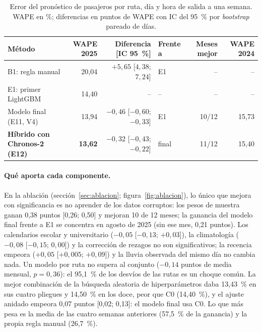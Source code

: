 \begin{table}[t]
  \centering\footnotesize
  \setlength{\tabcolsep}{3.5pt}
  \caption{Error del pronóstico de pasajeros por ruta, día y hora de salida a una semana. WAPE en \%; diferencias
  en puntos de WAPE con IC del 95~\% por \emph{bootstrap} pareado de días.}
  \label{tab:wape}
  \begin{tabular}{@{}l r r l r r@{}}
    \toprule
    Método & WAPE 2025 & Diferencia [IC 95~\%] & Frente a & Meses mejor & WAPE 2024 \\
    \midrule
    B1: regla manual & 20,04 & $+5{,}65$ [$4{,}38$; $7{,}24$] & E1 & -- & -- \\
    E1: primer LightGBM & 14,40 & -- & -- & -- & -- \\
    Modelo final (E11, V4) & 13,94 & $-0{,}46$ [$-0{,}60$; $-0{,}33$] & E1 & 10/12 & 15,73 \\
    \textbf{Híbrido con Chronos-2 (E12)} & \textbf{13,62} & $-0{,}32$ [$-0{,}43$; $-0{,}22$] & final & 11/12 & 15,40 \\
    \bottomrule
  \end{tabular}
\end{table}

\paragraph{Qué aporta cada componente.} En la ablación (sección~\ref{sec:ablacion}; figura~\ref{fig:ablacion}), lo
único que mejora con significancia es no aprender de los datos corruptos: los pesos de muestra ganan 0,38 puntos
[0,26; 0,50] y mejoran 10 de 12 meses; la ganancia del modelo final frente a E1 se concentra en agosto de 2025 (sin ese
mes, 0,21 puntos). Los calendarios escolar y universitario ($-0{,}05$ [$-0{,}13$; $+0{,}03$]), la climatología
($-0{,}08$ [$-0{,}15$; $0{,}00$]) y la corrección de rezagos no son significativos; la recencia empeora ($+0{,}05$
[$+0{,}005$; $+0{,}09$]) y la lluvia observada del mismo día no cambia nada. Un modelo por ruta no supera al conjunto
($-0{,}14$ puntos de media mensual, $p = 0{,}36$): el 95,1~\% de los desvíos de las rutas es un choque común. La mejor
combinación de la búsqueda aleatoria de hiperparámetros daba 13,43~\% en sus cuatro pliegues y 14,50~\% en los doce,
peor que C0 (14,40~\%), y el ajuste anidado empeora 0,07 puntos [0,02; 0,13]: el modelo final usa C0. Lo que más pesa es
la media de las cuatro semanas anteriores (57,5~\% de la ganancia) y la propia regla manual (26,7~\%).

